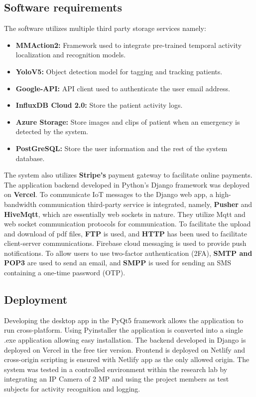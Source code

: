 \subsection{Software requirements}
The software utilizes multiple third party storage services namely:
\begin{itemize}
    \item \textbf{MMAction2:} Framework used to integrate pre-trained temporal activity localization and recognition models.
    \item \textbf{YoloV5:} Object detection model for tagging and tracking patients.
    \item \textbf{Google-API:} API client used to authenticate the user email address.
    \item \textbf{InfluxDB Cloud 2.0:} Store the patient activity logs.
    \item \textbf{Azure Storage:} Store images and clips of patient when an emergency is detected by the system.
    \item \textbf{PostGreSQL:} Store the user information and the rest of the system database.
\end{itemize}
The system also utilizes \textbf{Stripe's} payment gateway to facilitate online payments. The application backend developed in Python's Django framework was deployed on \textbf{Vercel}.
To communicate IoT messages to the Django web app, a high-bandwidth communication third-party service is integrated, namely, \textbf{Pusher} and \textbf{HiveMqtt}, which are essentially web sockets in nature. They utilize Mqtt and web socket communication protocols for communication. To facilitate the upload and download of pdf files, \textbf{FTP} is used, and \textbf{HTTP} has been used to facilitate client-server communications. Firebase cloud messaging is used to provide push notifications. To allow users to use two-factor authentication (2FA), \textbf{SMTP and POP3} are used to send an email, and \textbf{SMPP} is used for sending an SMS containing a one-time password (OTP). 
\subsection{Deployment}
Developing the desktop app in the PyQt5 framework allows the application to run cross-platform. Using Pyinstaller the application is converted into a single .exe application allowing easy installation. The backend developed in Django is deployed on Vercel in the free tier version. Frontend is deployed on Netlify and cross-origin scripting is ensured with Netlify app as the only allowed origin. The system was tested in a controlled environment within the research lab by integrating an IP Camera of 2 MP and using the project members as test subjects for activity recognition and logging.
